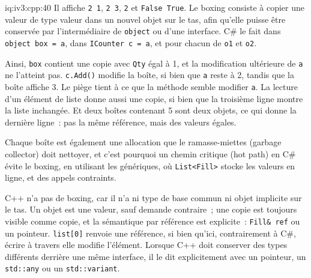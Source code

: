 \begin{solution}{iq:iv3:cpp:40}
Il affiche \texttt{2 1}, \texttt{2 3}, \texttt{2} et \texttt{False True}. Le boxing consiste à copier une valeur de type valeur dans un nouvel objet sur le tas, afin qu'elle puisse être conservée par l'intermédiaire de \texttt{object} ou d'une interface. C\# le fait dans \texttt{object box = a}, dans \texttt{ICounter c = a}, et pour chacun de \texttt{o1} et \texttt{o2}.

Ainsi, \texttt{box} contient une copie avec \texttt{Qty} égal à 1, et la modification ultérieure de \texttt{a} ne l'atteint pas. \texttt{c.Add()} modifie la boîte, si bien que \texttt{a} reste à 2, tandis que la boîte affiche 3. Le piège tient à ce que la méthode semble modifier \texttt{a}. La lecture d'un élément de liste donne aussi une copie, si bien que la troisième ligne montre la liste inchangée. Et deux boîtes contenant 5 sont deux objets, ce qui donne la dernière ligne~: pas la même référence, mais des valeurs égales.

Chaque boîte est également une allocation que le ramasse-miettes (garbage collector) doit nettoyer, et c'est pourquoi un chemin critique (hot path) en C\# évite le boxing, en utilisant les génériques, où \texttt{List<Fill>} stocke les valeurs en ligne, et des appels contraints.

C++ n'a pas de boxing, car il n'a ni type de base commun ni objet implicite sur le tas. Un objet est une valeur, sauf demande contraire~; une copie est toujours visible comme copie, et la sémantique par référence est explicite~: \texttt{Fill\& ref} ou un pointeur. \texttt{list[0]} renvoie une référence, si bien qu'ici, contrairement à C\#, écrire à travers elle modifie l'élément. Lorsque C++ doit conserver des types différents derrière une même interface, il le dit explicitement avec un pointeur, un \texttt{std::any} ou un \texttt{std::variant}.

\end{solution}


